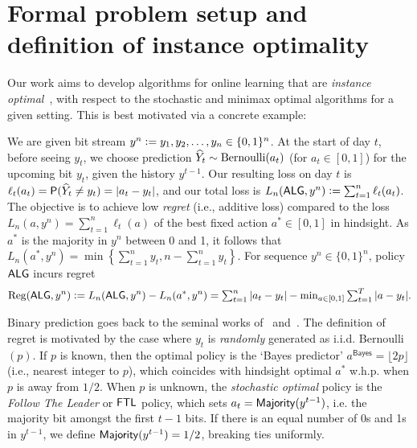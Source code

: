 \section{Formal problem setup and definition of instance optimality} 
Our work aims to develop algorithms for online learning that are \emph{instance optimal}~\citep{fagin2001optimal},\cite[Chapter $3$]{roughgarden2021beyond} with respect to the stochastic and minimax optimal algorithms for a given setting. This is best motivated via
a concrete example:
\begin{example}
We are given bit stream $y^n \mathrel{\mathop{:}}= y_1,y_2,\ldots,y_n\in\{0,1\}^n$.
At the start of day $t$, before seeing $y_t$, we choose prediction $\widehat{Y}_t \sim \mathrm{Bernoulli}(a_t)$ (for $a_t \in [0,1]$) for the upcoming bit $y_t$, given the history $y^{t-1}$. Our resulting loss on day $t$ is $\ell_t(a_t) = \mathsf{P}(\widehat{Y}_t \neq y_t) = |a_t - y_t|$, and our total loss is $L_n(\mathsf{ALG},y^n)\mathrel{\mathop{:}}= \sum_{t=1}^n\ell_t(a_t)$. The objective is to achieve low \emph{regret} (i.e., additive loss) compared to the loss $L_n(a,y^n)=\sum_{t=1}^n\ell_t(a)$ of the best fixed action $a^* \in[0,1]$ in hindsight. As $a^*$ is the majority in $y^n$ between 0 and 1, it follows that $L_n(a^*, y^n) = \min\left\{\sum_{t=1}^n y_t, n - \sum_{t=1}^n y_t\right\}$. For sequence $y^n \in \{0,1\}^n$, policy $\mathsf{ALG}$ incurs regret
\begin{align}
    \mathrm{Reg}(\mathsf{ALG}, y^n) \mathrel{\mathop{:}}= L_n(\mathsf{ALG},y^n) - L_n(a^*,y^n)
     = \textstyle\sum_{t=1}^n |a_t - y_t| - \min_{a\in[0,1]}\textstyle\sum_{t=1}^T|a-y_t|. \label{eq:regdefn}
\end{align}
\end{example}
Binary prediction goes back to the seminal works of~\cite{blackwell1956analog} and~\cite{hannan1957approximation}. The definition of regret is motivated by the case where $y_t$ is \emph{randomly} generated as i.i.d. Bernoulli$(p)$. If $p$ is known, then the optimal policy is the `Bayes predictor' $a^{\textsf{Bayes}}=\lfloor 2p\rfloor$ (i.e., nearest integer to $p$),
which coincides with hindsight optimal $a^*$ w.h.p. when $p$ is away from $1/2$. When $p$ is unknown, the \emph{stochastic optimal} policy is the \emph{Follow The Leader} or $\mathsf{FTL}$ policy, which sets $a_t=\mathsf{Majority}(y^{t-1})$, i.e. the majority bit amongst the first $t-1$ bits. If there is an equal number of 0s and 1s in $y^{t-1}$, we define $\mathsf{Majority}(y^{t-1})=1/2$, breaking ties uniformly. 

